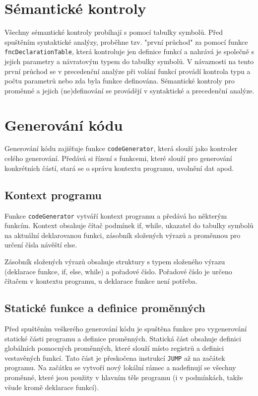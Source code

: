\documentclass[a4paper, 12pt]{article}
\begin{document}
    \section{Sémantické kontroly}
    Všechny sémantické kontroly probíhají s pomocí tabulky symbolů. Před spuštěním syntaktické analýzy, proběhne tzv. "první průchod" za pomocí funkce \texttt{fncDeclarationTable}, která kontroluje jen definice funkcí a nahrává je společně s jejich parametry a návratovým typem do tabulky symbolů. V návaznosti na tento první průchod se v precedenční analýze při volání funkcí provádí kontrola typu a počtu parametrů nebo zda byla funkce definována. Sémantické kontroly pro proměnné a jejich (ne)definování se provádějí v syntaktické a precedenční analýze.
    
    \section{Generování kódu} \label{generovani}
    Generování kódu zajišťuje funkce \texttt{codeGenerator}, která slouží jako kontroler celého generování. Předává si řízení s funkcemi, které slouží pro generování konkrétních částí, stará se o správu kontextu programu, uvolnění dat apod.

    \subsection{Kontext programu}
    Funkce \texttt{codeGenerator} vytváří kontext programu a předává ho některým funkcím. Kontext obsahuje čítač podmínek if, while, ukazatel do tabulky symbolů na aktuální deklarovanou funkci, zásobník složených výrazů a proměnnou pro určení čísla návěští else.

    Zásobník složených výrazů obsahuje struktury s typem složeného výrazu (deklarace funkce, if, else, while) a pořadové číslo. Pořadové číslo je určeno čítačem v kontextu programu, u deklarace funkce není potřeba.

    \subsection{Statické funkce a definice proměnných}
    Před spuštěním veškerého generování kódu je spuštěna funkce pro vygenerování statické části programu a definice proměnných. Statická část obsahuje definici globálních pomocných proměnných, které slouží místo registrů a definici vestavěných funkcí. Tato část je přeskočena instrukcí \texttt{JUMP} až na začátek programu. Na začátku se vytvoří nový lokální rámec a nadefinují se všechny proměnné, které jsou použity v hlavním těle programu (i v podmínkách, takže všude kromě deklarace funkcí).

    \subsection{}

    \newpage
	\renewcommand{\refname}{Zdroje}
	\printbibliography
\end{document}
